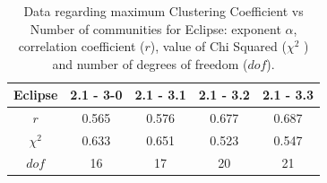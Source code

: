   \vspace{0.01\linewidth}

\begin{table}[htbp]
\begin{center}

\begin{tabular}{|c|c|c|c|c|}
\hline
\textbf{Eclipse} &2.1 - 3-0 & 2.1 - 3.1 & 2.1 - 3.2 & 2.1 - 3.3 \\
\hline
$r$ & 0.565  & 0.576 &  0.677 &  0.687\\ 

$\chi^2$ & 0.633& 0.651  & 0.523 & 0.547  \\

$dof$ & 16 & 17 & 20 & 21\\ 
\hline
\end{tabular}

\label{tab:log-log-cc}
\caption{Data regarding maximum Clustering Coefficient vs Number of communities for Eclipse: exponent $\alpha$, 
correlation coefficient ($r$), value of Chi Squared ($\chi^2$ ) and number of degrees of freedom ($dof$).}
\end{center}
\end{table}

